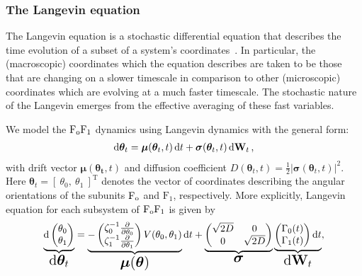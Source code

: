 \documentclass[11pt]{article}
\newcommand{\fo}{\mathrm{F}_{\rm o}}
\newcommand{\fI}{\mathrm{F}_{1}}
\newcommand{\fofI}{\mathrm{F}_{\rm o}\mathrm{F}_{1}}
\begin{document}
\subsubsection{The Langevin equation}

The Langevin equation is a stochastic differential equation that describes the time evolution of a subset of a system's coordinates~\cite{gardiner_stochastic_ref}. In particular, the (macroscopic) coordinates which the equation describes are taken to be those that are changing on a slower timescale in 
comparison to other (microscopic) coordinates which are evolving at a much faster timescale. The stochastic nature of the Langevin emerges from the effective averaging of these fast variables. 

We model the $\fofI$ dynamics using Langevin dynamics with the general form:
\begin{align}
    \dd{\bm{\theta}_{t}} = \bm{\mu}(\bm{\theta}_{t},t)\dd{t} + \bm{\sigma}(\bm{\theta}_{t},t)\dd{\vb{W}_{t}},
\end{align}
with drift vector $\bm{\mu}(\bm{\theta_{t}},t)$ and diffusion coefficient $D(\bm{\theta}_{t},t) = \frac{1}{2}|\bm{\sigma}(\bm{\theta}_{t},t)|^{2}$. Here $\bm{\theta}_{t} = \left[\ \theta_{0},\ \theta_{1}\ \right]^{\mathrm{T}}$ denotes the vector of coordinates describing the angular orientations of the subunits $\fo$ and $\fI$, respectively. More explicitly, Langevin equation for each subsystem of $\fofI$ is given by
\begin{align}
    \underbrace{\mathrm{d}
        \begin{pmatrix}
        \theta_{0} \\ \theta_{1}
        \end{pmatrix}}_{\text{\Large $\dd{\bm{\theta}_{t}}$}} =
    \underbrace{-\begin{pmatrix}
        \zeta_{0}^{-1}\pdv{}{\theta_{0}}\\
        \zeta_{1}^{-1}\pdv{}{\theta_{1}}
        \end{pmatrix}V(\theta_{0},\theta_{1})}_{\text{\Large $\bm{\mu}(\bm{\theta})$}}
    \dd{t}
    +
    \underbrace{\begin{pmatrix}
        \sqrt{2D} & 0\\
        0 & \sqrt{2D}
        \end{pmatrix}}_{\text{\Large $\bm{\sigma}$}}
    \underbrace{\begin{pmatrix}
        \Gamma_{0}(t)\\
        \Gamma_{1}(t)
        \end{pmatrix}
        \dd{t}}_{\text{\Large $\dd{\vb{W}_{t}}$}},\label{eq:multidim_sde}
\end{align}
\end{document}
